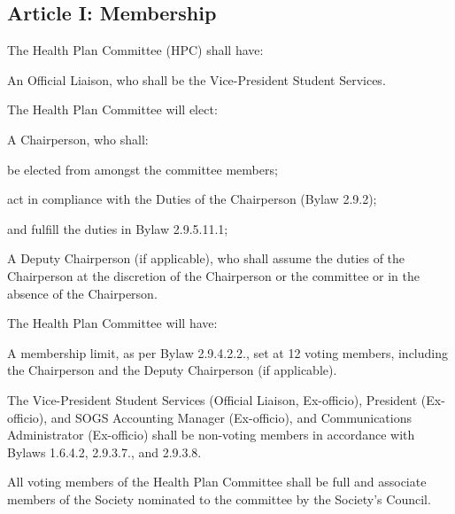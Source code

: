 \subsection{Article I: Membership}
\begin{longenum}[ label*=\thesubsection.\arabic*., align=left] 
\item The Health Plan Committee (HPC) shall have:
	\begin{longenum}[label*=\arabic*., align=left]	
	\item An Official Liaison, who shall be the Vice-President Student Services. 
	\end{longenum}
\item The Health Plan Committee will elect:
	\begin{longenum}[label*=\arabic*., align=left]	
	\item A Chairperson, who shall:
		\begin{longenum}[label*=\arabic*., align=left]	
		\item be elected from amongst the committee members;
		\item act in compliance with the Duties of the Chairperson (Bylaw 2.9.2);
		\item and fulfill the duties in Bylaw 2.9.5.11.1;
		\item A Deputy Chairperson (if applicable), who shall assume the duties of the Chairperson at the discretion of the Chairperson or the committee or in the absence of the Chairperson.
		\end{longenum}
	\end{longenum}
\item The Health Plan Committee will have:
	\begin{longenum}[label*=\arabic*., align=left]	
	\item A membership limit, as per Bylaw 2.9.4.2.2., set at 12 voting members, including the Chairperson and the Deputy Chairperson (if applicable).
	\end{longenum}
\item The Vice-President Student Services (Official Liaison, Ex-officio), President (Ex-officio), and SOGS Accounting Manager (Ex-officio), and Communications Administrator (Ex-officio) shall be non-voting members in accordance with Bylaws 1.6.4.2, 2.9.3.7., and 2.9.3.8.
\item All voting members of the Health Plan Committee shall be full and associate members of the Society nominated to the committee by the Society’s Council.    
\end{longenum}

